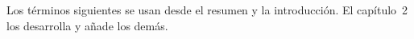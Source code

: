 %
%
%

Los términos siguientes se usan desde el resumen y la introducción. El
capítulo~2 los desarrolla y añade los demás.

